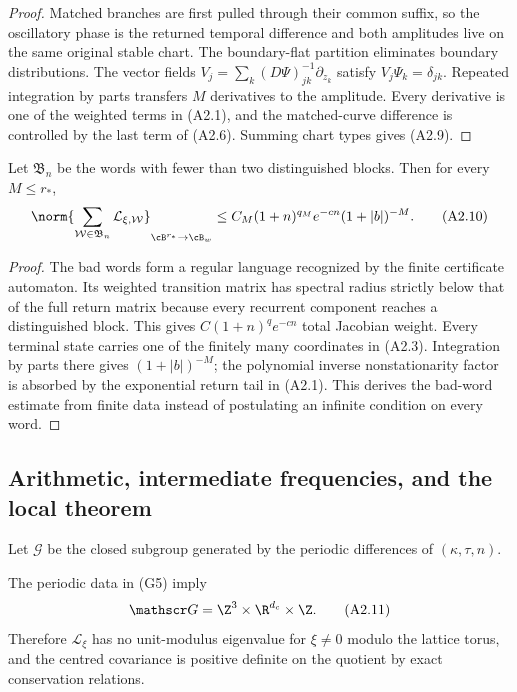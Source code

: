\begin{proof}
Matched branches are first pulled through their common suffix, so the
oscillatory phase is the returned temporal difference and both amplitudes live
on the same original stable chart.  The boundary-flat partition eliminates
boundary distributions.  The vector fields
$V_j=\sum_k(D\Psi)^{-1}_{jk}\partial_{z_k}$ satisfy
$V_j\Psi_k=\delta_{jk}$.  Repeated integration by parts transfers $M$
derivatives to the amplitude.  Every derivative is one of the weighted terms
in (A2.1), and the matched-curve difference is controlled by the last term of
(A2.6).  Summing chart types gives (A2.9).
\end{proof}

\begin{lemma}
\label{lem:r29-a2-bad}
Let $\mathfrak B_n$ be the words with fewer than two distinguished blocks.
Then for every $M\le r_*$,
\[
 \norm{\sum_{\mathcal W\in\mathfrak B_n}
       \mathcal L_{\xi,\mathcal W}}_{\cB^{r_*}\to\cB_w}
 \le C_M(1+n)^{q_M}e^{-cn}(1+|b|)^{-M}.                  \tag{A2.10}
\]
\end{lemma}

\begin{proof}
The bad words form a regular language recognized by the finite certificate
automaton.  Its weighted transition matrix has spectral radius strictly below
that of the full return matrix because every recurrent component reaches a
distinguished block.  This gives $C(1+n)^qe^{-cn}$ total Jacobian weight.
Every terminal state carries one of the finitely many coordinates in (A2.3).
Integration by parts there gives $(1+|b|)^{-M}$; the polynomial inverse
nonstationarity factor is absorbed by the exponential return tail in (A2.1).
This derives the bad-word estimate from finite data instead of postulating an
infinite condition on every word.
\end{proof}

\subsection{Arithmetic, intermediate frequencies, and the local theorem}

Let $\mathscr G$ be the closed subgroup generated by the periodic differences
of $(\kappa,\tau,n)$.

\begin{lemma}
\label{lem:r29-a2-annihilator}
The periodic data in (G5) imply
\[
 \mathscr G=\Z^3\times\R^{d_c}\times\Z.                  \tag{A2.11}
\]
Therefore $\mathcal L_\xi$ has no unit-modulus eigenvalue for
$\xi\ne0$ modulo the lattice torus, and the centred covariance is positive
definite on the quotient by exact conservation relations.
\end{lemma}

